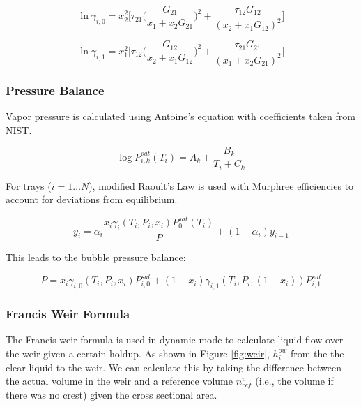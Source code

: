 \begin{equation}
    \ln \gamma_{i,0} = x_2^2\biggl [\tau_{21} \biggl (\frac{G_{21}}{x_1+x_2G_{21}}\biggr)^2 + \frac{\tau_{12}G_{12}}{(x_2 + x_1 G_{12})^2} \biggr ]
\end{equation}

\begin{equation}
     \ln \gamma_{i,1} = x_1^2\biggl [\tau_{12} \biggl (\frac{G_{12}}{x_2+x_1G_{12}}\biggr)^2 + \frac{\tau_{21}G_{21}}{(x_1 + x_2 G_{21})^2} \biggr ]   
\end{equation}

\subsubsection{Pressure Balance}

Vapor pressure is calculated using Antoine’s equation with coefficients taken from NIST. 

\begin{equation}
    \log P_{i,k}^{sat}(T_i) = A_k + \frac{B_k}{T_i + C_k}
\end{equation}

For trays ($i=1\dots N$), modified Raoult’s Law is used with Murphree efficiencies to account for deviations from equilibrium.

\begin{equation}
    y_i = \alpha_i\frac{x_i\gamma_i(T_i, P_i, x_i)P_0^{sat}(T_i)}{P} + (1-\alpha_i)y_{i-1}
\end{equation}

This leads to the bubble pressure balance:

\begin{equation}
    P = x_i\gamma_{i,0}(T_i, P_i, x_i)P^{sat}_{i,0} + (1-x_i)\gamma_{i,1}(T_i, P_i, (1-x_i))P^{sat}_{i,1}
\end{equation}

\subsubsection{Francis Weir Formula}

The Francis weir formula is used in dynamic mode to calculate liquid flow over the weir given a certain holdup. As shown in Figure \ref{fig:weir}, $h_i^{ow}$ from the the clear liquid to the weir. We can calculate this by taking the difference between the actual volume in the weir and a reference volume $n^v_{ref}$ (i.e., the volume if there was no crest) given the cross sectional area.

